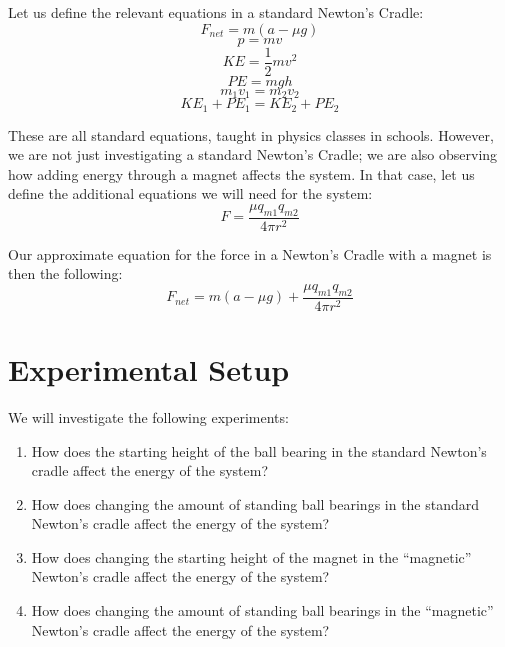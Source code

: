 \documentclass[aip,jmp,amsmath,amssymb,reprint,author-numerical]{revtex4-1}
\begin{document}
        Let us define the relevant equations in a standard Newton's Cradle:
        \begin{equation}
            F_{net}=m(a-\mu g)
        \end{equation}
        \begin{equation}
            p=mv
        \end{equation}
        \begin{equation}
            KE=\frac{1}{2}mv^2
        \end{equation}
        \begin{equation}
            PE=mgh
        \end{equation}
        \begin{equation}
            m_{1}v_{1}=m_{2}v_{2}
        \end{equation}
        \begin{equation}
            KE_{1}+PE_{1}=KE_{2}+PE_{2}
        \end{equation}

        These are all standard equations, taught in physics classes in schools. However, we are not
        just investigating a standard Newton's Cradle; we are also observing how adding energy through
        a magnet affects the system. In that case, let us define the additional equations we will need
        for the system:
        \begin{equation}
            F=\frac{\mu q_{m1}q_{m2}}{4\pi r^2}
        \end{equation}

        Our approximate equation for the force in a Newton's Cradle with a magnet is then the following:
        \begin{equation}
            F_{net}=m(a-\mu g) + \frac{\mu q_{m1}q_{m2}}{4\pi r^2}
        \end{equation}


    \section{\label{sec:expset}Experimental Setup}

        We will investigate the following experiments:
        \begin{enumerate}
            \item How does the starting height of the ball bearing in the standard Newton's cradle
                affect the energy of the system?
            \item How does changing the amount of standing ball bearings in the standard Newton's cradle
                affect the energy of the system?
            \item How does changing the starting height of the magnet in the ``magnetic'' Newton's
                cradle affect the energy of the system?
            \item How does changing the amount of standing ball bearings in the ``magnetic'' Newton's
                cradle affect the energy of the system?
        \end{enumerate}
\end{document}
